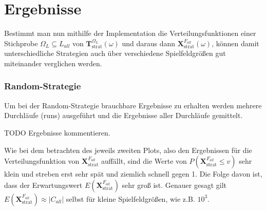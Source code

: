 \documentclass[a4paper,12pt]{llncs}
\numberwithin{equation}{section}
\DeclareMathOperator{\strat}{strat}
\begin{document}


\section{Ergebnisse}


Bestimmt man nun mithilfe der Implementation die Verteilungsfunktionen einer Stichprobe $\Omega_L \subseteq L_{all}$ von $\mathbf{T}^{\Omega_L}_{\strat}(\omega)$ und daraus dann $\mathbf{X}^{F_{all}}_{\strat}(\omega)$, können damit unterschiedliche Strategien auch über verschiedene Spielfeldgrößen gut miteinander verglichen werden.

\subsubsection{Random-Strategie}

Um bei der Random-Strategie brauchbare Ergebnisse zu erhalten werden mehrere Durchläufe (runs) ausgeführt und die Ergebnisse aller Durchläufe gemittelt.

TODO Ergebnisse kommentieren.

\begin{landscape}
	
\end{landscape}

\begin{landscape}
	
\end{landscape}

\begin{landscape}
	
\end{landscape}

\begin{landscape}
	
\end{landscape}

\begin{landscape}
	
\end{landscape}


Wie bei dem betrachten des jeweils zweiten Plots, also den Ergebnissen für die Verteilungsfunktion von $\mathbf{X}^{F_{all}}_{\strat}$ auffällt, sind die Werte von $P(\mathbf{X}^{F_{all}}_{\strat} \leq v)$ sehr klein und streben erst sehr spät und ziemlich schnell gegen 1. Die Folge davon ist, dass der Erwartungswert $E(\mathbf{X}^{F_{all}}_{\strat})$ sehr groß ist. Genauer gesagt gilt $E(\mathbf{X}^{F_{all}}_{\strat}) \approx |C_{all}|$ selbst für kleine Spielfeldgrößen, wie z.B. $10^3$.
\end{document}
